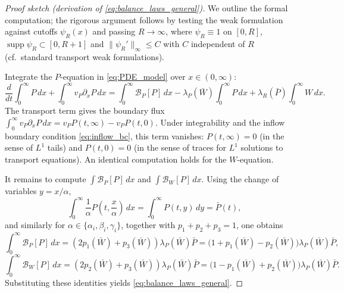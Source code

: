 \documentclass[10pt,a4paper]{amsart}
\begin{document}
\begin{proof}[Proof sketch (derivation of \eqref{eq:balance_laws_general})]
We outline the formal computation; the rigorous argument follows by testing the weak formulation
against cutoffs $\psi_R(x)$ and passing $R\to\infty$, where $\psi_R \equiv 1$ on $[0,R]$, $\operatorname{supp} \psi_R \subset [0,R+1]$ and $\lVert\psi_R' \rVert_{\infty}\le C$ with $C$ independent of $R$ (cf.\ standard transport weak formulations).

Integrate the $P$-equation in \eqref{eq:PDE_model} over $x\in(0,\infty)$:
\[
\frac{d}{dt}\int_0^\infty P\,dx
+\int_0^\infty v_P\partial_x P\,dx
=\int_0^\infty \mathcal B_P[P]\,dx
-\lambda_P(\bar W)\int_0^\infty P\,dx
+\lambda_R(\bar P)\int_0^\infty W\,dx.
\]
The transport term gives the boundary flux
$\int_0^\infty v_P\partial_x P\,dx = v_P P(t,\infty)-v_P P(t,0)$.
Under integrability and the inflow boundary condition \eqref{eq:inflow_bc}, this term vanishes:
$P(t,\infty)=0$ (in the sense of $L^1$ tails) and $P(t,0)=0$ (in the sense of traces for $L^1$ solutions to transport equations).
An identical computation holds for the $W$-equation.

It remains to compute $\int \mathcal B_P[P]\,dx$ and $\int \mathcal B_W[P]\,dx$.
Using the change of variables $y=x/\alpha$,
\[
\int_0^\infty \frac{1}{\alpha}P\!\left(t,\frac{x}{\alpha}\right)\,dx
=\int_0^\infty P(t,y)\,dy=\bar P(t),
\]
and similarly for $\alpha\in\{\alpha_i,\beta_i,\gamma_i\}$, together with $p_1+p_2+p_3=1$,
one obtains
\[
\int_0^\infty \mathcal B_P[P]\,dx=(2p_1(\bar W)+p_3(\bar W))\lambda_P(\bar W)\bar P
=\big(1+p_1(\bar W)-p_2(\bar W)\big)\lambda_P(\bar W)\bar P,
\]
\[
\int_0^\infty \mathcal B_W[P]\,dx=(2p_2(\bar W)+p_3(\bar W))\lambda_P(\bar W)\bar P
=\big(1-p_1(\bar W)+p_2(\bar W)\big)\lambda_P(\bar W)\bar P.
\]
Substituting these identities yields \eqref{eq:balance_laws_general}.
\end{proof}
\end{document}
